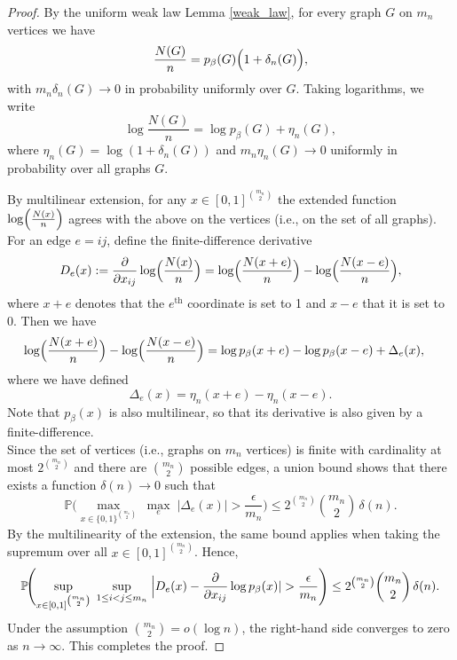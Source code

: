 \documentclass[12pt]{article}
\numberwithin{equation}{section}
\begin{document}
\begin{proof}
By the uniform weak law Lemma \ref{weak_law}, for every graph \(G\) on \(m_n\) vertices we have
\[
\frac{N(G)}{n} = p_{\beta}(G)\Bigl(1+\delta_n(G)\Bigr),
\]
with \(m_n\delta_n(G) \to 0\) in probability uniformly over \(G\). Taking logarithms, we write
\[
\log\frac{N(G)}{n} = \log p_{\beta}(G) + \eta_n(G),
\]
where \(\eta_n(G)=\log(1+\delta_n(G))\) and \(m_n\eta_n(G)\to 0\) uniformly in probability over all graphs \(G\).

By multilinear extension, for any \(x\in[0,1]^{\binom{m_n}{2}}\) the extended function \(\log\Bigl(\frac{N(x)}{n}\Bigr)\) agrees with the above on the vertices (i.e., on the set of all graphs). For an edge \(e=ij\), define the finite-difference derivative
\[
D_e(x) := \frac{\partial}{\partial x_{ij}}\log\Bigl(\frac{N(x)}{n}\Bigr)
=\log\Bigl(\frac{N(x+e)}{n}\Bigr) - \log\Bigl(\frac{N(x-e)}{n}\Bigr),
\]
where \(x+e\) denotes that the \(e^{\text{th}}\) coordinate is set to 1 and \(x-e\) that it is set to 0.
Then we have
\[
\begin{aligned}
\log\Bigl(\frac{N(x+e)}{n}\Bigr) - \log\Bigl(\frac{N(x-e)}{n}\Bigr)
& = \log p_{\beta}(x+e) - \log p_{\beta}(x-e) + \Delta_e(x),
\end{aligned}
\]
where we have defined
\[
\Delta_e(x) = \eta_n(x+e)-\eta_n(x-e).
\]
Note that \(p_{\beta}(x)\) is also multilinear, so that its derivative is also given by a finite-difference.\\
Since the set of vertices (i.e., graphs on \(m_n\) vertices) is finite with cardinality at most \(2^{\binom{m_n}{2}}\) and there are \(\binom{m_n}{2}\) possible edges, a union bound shows that there exists a function \(\delta(n)\to 0\) such that
\[
\mathbb{P}\Biggl(\max_{x\in\{0,1\}^{\binom{m_n}{2}}}\; \max_{e}\; |\Delta_e(x)| > \frac{\epsilon}{m_n}\Biggr)
\le 2^{\binom{m_n}{2}}\binom{m_n}{2}\,\delta(n).
\]
By the multilinearity of the extension, the same bound applies when taking the supremum over all \(x\in[0,1]^{\binom{m_n}{2}}\). Hence,
\[
\mathbb{P}\!\Biggl(\sup_{x\in[0,1]^{\binom{m_n}{2}}}\; \sup_{1\le i<j\le m_n}\; \Bigl|D_e(x)-\frac{\partial}{\partial x_{ij}}\log p_{\beta}(x)| > \frac{\epsilon}{m_n}\Biggr)
\le 2^{\binom{m_n}{2}}\binom{m_n}{2}\,\delta(n).
\]
Under the assumption \(\binom{m_n}{2} = o(\log n)\), the right-hand side converges to zero as \(n\to\infty\). This completes the proof.
\end{proof}
\end{document}
